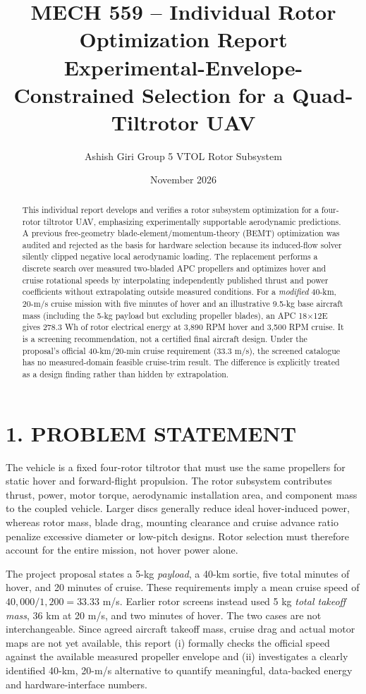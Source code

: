 \documentclass[12pt]{article}
\title{\textbf{MECH 559 -- Individual Rotor Optimization Report}\\
\large Experimental-Envelope-Constrained Selection for a Quad-Tiltrotor UAV}
\author{Ashish Giri \quad Group 5 \quad VTOL Rotor Subsystem}
\date{November 2026}
\begin{document}
\maketitle
\begin{abstract}
This individual report develops and verifies a rotor subsystem optimization for a four-rotor tiltrotor UAV, emphasizing experimentally supportable aerodynamic predictions. A previous free-geometry blade-element/momentum-theory (BEMT) optimization was audited and rejected as the basis for hardware selection because its induced-flow solver silently clipped negative local aerodynamic loading. The replacement performs a discrete search over measured two-bladed APC propellers and optimizes hover and cruise rotational speeds by interpolating independently published thrust and power coefficients without extrapolating outside measured conditions. For a \emph{modified} 40-km, 20-m/s cruise mission with five minutes of hover and an illustrative 9.5-kg base aircraft mass (including the 5-kg payload but excluding propeller blades), an APC 18$\times$12E gives 278.3 Wh of rotor electrical energy at 3,890 RPM hover and 3,500 RPM cruise. It is a screening recommendation, not a certified final aircraft design. Under the proposal's official 40-km/20-min cruise requirement (33.3 m/s), the screened catalogue has no measured-domain feasible cruise-trim result. The difference is explicitly treated as a design finding rather than hidden by extrapolation.
\end{abstract}

\section*{1. PROBLEM STATEMENT}
The vehicle is a fixed four-rotor tiltrotor that must use the same propellers for static hover and forward-flight propulsion. The rotor subsystem contributes thrust, power, motor torque, aerodynamic installation area, and component mass to the coupled vehicle. Larger discs generally reduce ideal hover-induced power, whereas rotor mass, blade drag, mounting clearance and cruise advance ratio penalize excessive diameter or low-pitch designs. Rotor selection must therefore account for the entire mission, not hover power alone.

The project proposal states a 5-kg \emph{payload}, a 40-km sortie, five total minutes of hover, and 20 minutes of cruise. These requirements imply a mean cruise speed of $40{,}000/1{,}200=33.33$ m/s. Earlier rotor screens instead used 5 kg \emph{total takeoff mass}, 36 km at 20 m/s, and two minutes of hover. The two cases are not interchangeable. Since agreed aircraft takeoff mass, cruise drag and actual motor maps are not yet available, this report (i) formally checks the official speed against the available measured propeller envelope and (ii) investigates a clearly identified 40-km, 20-m/s alternative to quantify meaningful, data-backed energy and hardware-interface numbers.
\end{document}

